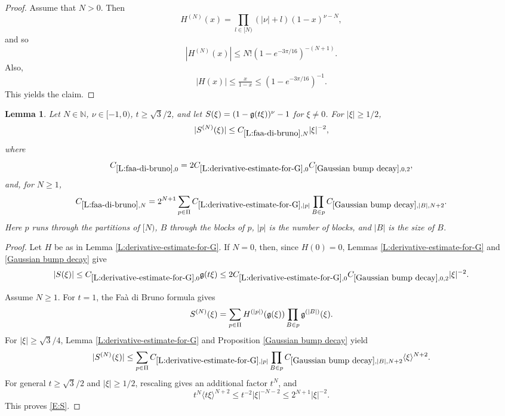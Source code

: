 \documentclass[12pt,reqno]{amsart}
\theoremstyle{plain}
\newtheorem{lemma}[theorem]{Lemma}
\numberwithin{equation}{section}
\theoremstyle{remark}
\newcommand{\using}[1]{}
\newcommand{\N}{{\mathbb N}}
\begin{document}
\begin{proof}
Assume that $N >0$. Then
\[
H^{(N)}(x)=\prod_{l\in [N)} (|\nu|+l)(1-x)^{\nu-N},
\]
and so
\[
|H^{(N)}(x)| \leq N! \left(1 - e^{-3\pi/16}\right)^{-(N+1)}.
\]
Also,
\[
|H(x)| \leq \tfrac{x}{1-x} \leq \left(1 - e^{-3\pi/16}\right)^{-1}.
\]
This yields the claim.
\end{proof}


\begin{lemma}\label{L:faa-di-bruno}\using{L:derivative-estimate-for-G}\using{Gaussian bump decay}
Let $N\in\N$, $\nu\in[-1,0)$, $t\ge\sqrt3/2$, and let $S(\xi)=(1-\mathfrak{g}(t\xi))^\nu-1$ for $\xi\ne0$. For $|\xi|\ge1/2$,
\begin{equation}\label{E:S}
|S^{(N)}(\xi)|\le C_{\ref{L:faa-di-bruno},N}|\xi|^{-2},
\end{equation}
where
\begin{equation}\label{auto:Faa-di-Bruno-zero-constant}
C_{\ref{L:faa-di-bruno},0}
=2C_{\ref{L:derivative-estimate-for-G},0}C_{\ref{Gaussian bump decay},0,2},
\end{equation}
and, for $N\ge1$,
\begin{equation}\label{auto:Faa-di-Bruno-positive-constant}
C_{\ref{L:faa-di-bruno},N}
=2^{N+1}\sum_{p\in\Pi}C_{\ref{L:derivative-estimate-for-G},|p|}
\prod_{B\in p}C_{\ref{Gaussian bump decay},|B|,N+2}.
\end{equation}
Here $p$ runs through the partitions of $[N)$, $B$ through the blocks of $p$, $|p|$ is the number of blocks, and $|B|$ is the size of $B$.
\end{lemma}
\begin{proof}
Let $H$ be as in Lemma \ref{L:derivative-estimate-for-G}. If $N=0$, then, since $H(0)=0$, Lemmas \ref{L:derivative-estimate-for-G} and \ref{Gaussian bump decay} give
\[
|S(\xi)|
\le C_{\ref{L:derivative-estimate-for-G},0}\mathfrak{g}(t\xi)
\le2C_{\ref{L:derivative-estimate-for-G},0}C_{\ref{Gaussian bump decay},0,2}|\xi|^{-2}.
\]

Assume $N\ge1$. For $t=1$, the Fa\`a di Bruno formula gives
\[
S^{(N)}(\xi)
=
\sum_{p\in\Pi}H^{(|p|)}(\mathfrak{g}(\xi))
\prod_{B\in p}\mathfrak{g}^{(|B|)}(\xi).
\]
For $|\xi|\ge\sqrt3/4$, Lemma \ref{L:derivative-estimate-for-G} and Proposition \ref{Gaussian bump decay} yield
\[
|S^{(N)}(\xi)|
\le
\sum_{p\in\Pi}C_{\ref{L:derivative-estimate-for-G},|p|}
\prod_{B\in p}C_{\ref{Gaussian bump decay},|B|,N+2}
\langle\xi\rangle^{N+2}.
\]
For general $t\ge\sqrt3/2$ and $|\xi|\ge1/2$, rescaling gives an additional factor $t^N$, and
\[
t^N\langle t\xi\rangle^{N+2}
\le t^{-2}|\xi|^{-N-2}
\le2^{N+1}|\xi|^{-2}.
\]
This proves \eqref{E:S}.
\end{proof}
\end{document}
